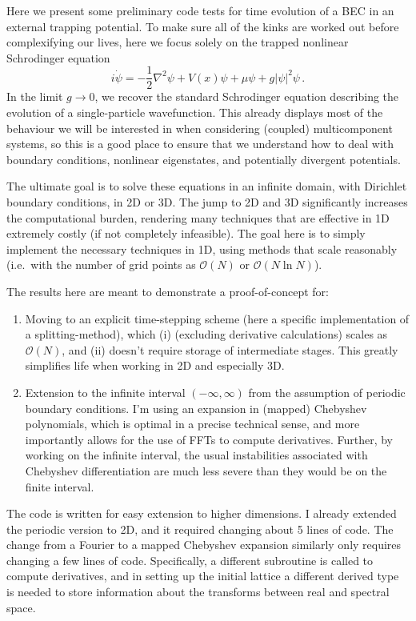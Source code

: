 \documentclass{revtex4}
\begin{document}
Here we present some preliminary code tests for time evolution of a BEC in an external trapping potential.  To make sure all of the kinks are worked out before complexifying our lives, here we focus solely on the trapped nonlinear Schrodinger equation
\begin{equation}
  i\dot{\psi} = -\frac{1}{2}\nabla^2\psi + V(x)\psi + \mu\psi + g\left|\psi\right|^2\psi \, .
\end{equation}
In the limit $g \to 0$, we recover the standard Schrodinger equation describing the evolution of a single-particle wavefunction.
This already displays most of the behaviour we will be interested in when considering (coupled) multicomponent systems, so this is a good place to ensure that we understand how to deal with boundary conditions, nonlinear eigenstates, and potentially divergent potentials.

The ultimate goal is to solve these equations in an infinite domain, with Dirichlet boundary conditions, in 2D or 3D.  The jump to 2D and 3D significantly increases the computational burden, rendering many techniques that are effective in 1D extremely costly (if not completely infeasible).  The goal here is to simply implement the necessary techniques in 1D, using methods that scale reasonably (i.e.\ with the number of grid points as $\mathcal{O}(N)$ or $\mathcal{O}(N\ln N)$).

The results here are meant to demonstrate a proof-of-concept for:
\begin{enumerate}
\item Moving to an explicit time-stepping scheme (here a specific implementation of a splitting-method), which (i) (excluding derivative calculations) scales as $\mathcal{O}(N)$, and (ii) doesn't require storage of intermediate stages.  This greatly simplifies life when working in 2D and especially 3D.
\item Extension to the infinite interval $(-\infty,\infty)$ from the assumption of periodic boundary conditions.  I'm using an expansion in (mapped) Chebyshev polynomials, which is optimal in a precise technical sense, and more importantly allows for the use of FFTs to compute derivatives.  Further, by working on the infinite interval, the usual instabilities associated with Chebyshev differentiation are much less severe than they would be on the finite interval.
\end{enumerate}

The code is written for easy extension to higher dimensions.  I already extended the periodic version to 2D, and it required changing about 5 lines of code.  The change from a Fourier to a mapped Chebyshev expansion similarly only requires changing a few lines of code.  Specifically, a different subroutine is called to compute derivatives, and in setting up the initial lattice a different derived type is needed to store information about the transforms between real and spectral space.
\end{document}
